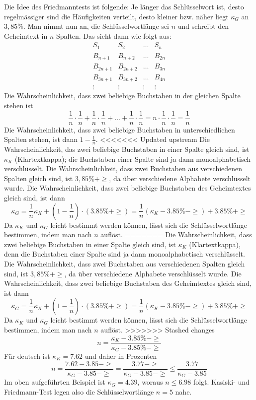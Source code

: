 \documentclass[%
<<<<<<< Updated upstream
11pt,%
twoside,%
titlepage,%
german,%
headsepline%
]{scrartcl}
\begin{document}
Die Idee des Friedmanntests ist folgende: Je länger das Schlüsselwort ist, desto regelmässiger sind die Häufigkeiten verteilt, desto kleiner bzw. näher liegt $\kappa_G$ an $3,85\%$.
Man nimmt nun an, die Schlüsselwortlänge sei $n$ und schreibt den Geheimtext in $n$ Spalten. Das sieht dann wie folgt aus:
$$
\begin{matrix}
S_{1\phantom{x+1}} & S_{2\phantom{x+1}} & \dots & S_{n\phantom{1}}\\
B_{n+1\phantom{1}} & B_{n+2\phantom{1}} & \dots & B_{2n}\\
B_{2n+1} & B_{2n+2} & \dots & B_{3n}\\
B_{3n+1} & B_{3n+2} & \dots & B_{4n}\\
\vdots & \vdots & \vdots & \vdots
\end{matrix}
$$
Die Wahrscheinlichkeit, dass zwei beliebige Buchstaben in der gleichen Spalte stehen ist
$$\frac{1}{n}\cdot\frac{1}{n}+\frac{1}{n}\cdot\frac{1}{n}+\dots+\frac{1}{n}\cdot\frac{1}{n}=n\cdot\frac{1}{n}\cdot\frac{1}{n}=\frac{1}{n}$$
Die Wahrscheinlichkeit, dass zwei beliebige Buchstaben in unterschiedlichen Spalten stehen, ist dann $1-\frac{1}{n}$.
<<<<<<< Updated upstream
Die Wahrscheinlichkeit, das zwei beliebige Buchstaben in einer Spalte gleich sind, ist $\kappa_K$ (Klartextkappa); die Buchstaben einer Spalte sind ja dann monoalphabetisch verschlüsselt.
Die Wahrscheinlichkeit, dass zwei Buchstaben aus verschiedenen Spalten gleich sind, ist $3,85\%+\ge$, da über verschiedene Alphabete verschlüsselt wurde. Die Wahrscheinlichkeit, dass zwei beliebige Buchstaben des Geheimtextes gleich sind, ist dann
$$\kappa_G=\frac{1}{n}\kappa_K+(1-\frac{1}{n})\cdot(3.85\%+\ge)=\frac{1}{n}(\kappa_K-3.85\%-\ge)+3.85\%+\ge$$
Da $\kappa_K$ und $\kappa_G$ leicht bestimmt werden k\"onnen, lässt sich die Schlüsselwortlänge bestimmen, indem man nach $n$ auflöst.
=======
Die Wahrscheinlichkeit, dass zwei beliebige Buchstaben in einer Spalte gleich sind, ist $\kappa_K$ (Klartextkappa), denn die Buchstaben einer Spalte sind ja dann monoalphabetisch verschlüsselt.
Die Wahrscheinlichkeit, dass zwei Buchstaben aus verschiedenen Spalten gleich sind, ist $3,85\%+\ge$, da über verschiedene Alphabete verschlüsselt wurde. Die Wahrscheinlichkeit, dass zwei beliebige Buchstaben des Geheimtextes gleich sind, ist dann
$$\kappa_G=\frac{1}{n}\kappa_K+(1-\frac{1}{n})\cdot(3.85\%+\ge)=\frac{1}{n}(\kappa_K-3.85\%-\ge)+3.85\%+\ge$$
Da $\kappa_K$ und $\kappa_G$ leicht bestimmt werden können, lässt sich die Schlüsselwortlänge bestimmen, indem man nach $n$ auflöst.
>>>>>>> Stashed changes
$$n=\frac{\kappa_K-3.85\%-\ge}{\kappa_G-3.85\%-\ge}$$
Für deutsch ist $\kappa_K=7.62$ und daher in Prozenten
$$n=\frac{7.62-3.85-\ge}{\kappa_G-3.85-\ge}=\frac{3.77-\ge}{\kappa_G-3.85-\ge}\leq\frac{3.77}{\kappa_G-3.85}$$
Im oben aufgeführten Beispiel ist $\kappa_G=4.39$, woraus $n\leq6.98$ folgt.
Kasiski- und Friedmann-Test legen also die Schlüsselwortlänge $n=5$ nahe.
\end{document}
